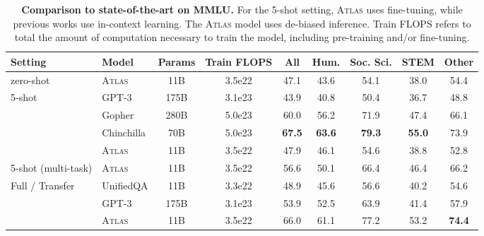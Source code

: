 \documentclass[10pt]{article} \usepackage[preprint]{tmlr}
\newcommand{\Atlas}{\textsc{Atlas}}
\begin{document}
\begin{table}[t]
  \centering
  \caption{\textbf{Comparison to state-of-the-art on MMLU.} For the 5-shot setting, \Atlas{} uses fine-tuning, while previous works use in-context learning. The \Atlas{} model uses de-biased inference.
    Train FLOPS refers to total the amount of computation necessary to train the model, including pre-training and/or fine-tuning.}
  \label{table:mmlu_sota}
  \vspace{0.5em}
  \small
  \begin{tabular}{ll cc c cccc}
    \toprule
    Setting                 & Model      & Params & Train \textsc{FLOPS} & All  & Hum. & Soc. Sci. & STEM & Other \\
    \midrule
        \multirow{1}{*}{zero-shot}     & \Atlas       & 11B    & 3.5e22 & 47.1 & 43.6&	54.1&	38.0&	54.4  \\
      \midrule
    \multirow{4}{*}{5-shot} & GPT-3      & 175B   & 3.1e23      & 43.9 & 40.8 & 50.4 & 36.7 & 48.8 \\
                            & Gopher     & 280B   & 5.0e23      & 60.0 & 56.2 & 71.9 & 47.4 & 66.1 \\
                            & Chinchilla & 70B    & 5.0e23      & \textbf{67.5} & \textbf{63.6} & \textbf{79.3} & \textbf{55.0} & 73.9 \\
                            & \Atlas   & 11B    & 3.5e22  & 47.9 & 46.1	&54.6&	38.8&	52.8 \\
      \midrule
     \multirow{1}{*}{5-shot (multi-task)}     & \Atlas       & 11B    &  3.5e22 & 	56.6 & 50.1&	66.4&	46.4&	66.2 \\
    \midrule
    \multirow{3}{*}{Full / Transfer}   & UnifiedQA  & 11B    & 3.3e22 & 48.9 & 45.6 & 56.6 & 40.2 & 54.6 \\
                            & GPT-3      & 175B   & 3.1e23 & 53.9 & 52.5 & 63.9 & 41.4 & 57.9 \\
                            & \Atlas       & 11B    & 3.5e22 & 66.0  & 61.1&	77.2&	53.2&	\textbf{74.4}\\
    \bottomrule
  \end{tabular}
\end{table}
\end{document}
